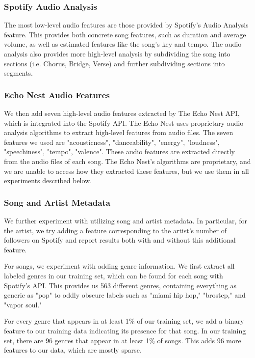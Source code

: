 \documentclass[journal]{IEEEtran}
\begin{document}
\subsubsection{Spotify Audio Analysis}
The most low-level audio features are those provided by Spotify's Audio Analysis feature. This provides both concrete song features, such as duration and average volume, as well as estimated features like the song's key and tempo. The audio analysis also provides more high-level analysis by subdividing the song into sections (i.e. Chorus, Bridge, Verse) and further subdividing sections into segments. \\

\subsubsection{Echo Nest Audio Features}
We then add seven high-level audio features extracted by The Echo Nest API, which is integrated into the Spotify API. The Echo Nest uses proprietary audio analysis algorithms to extract high-level features from audio files. The seven features we used are "acousticness", "danceability", "energy", "loudness", "speechiness", "tempo", "valence". These audio features are extracted directly from the audio files of each song. The Echo Nest's algorithms are proprietary, and we are unable to access how they extracted these features, but we use them in all experiments described below. \\

\subsubsection{Song and Artist Metadata}
We further experiment with utilizing song and artist metadata. In particular, for the artist, we try adding a feature corresponding to the artist's number of followers on Spotify and report results both with and without this additional feature. 

For songs, we experiment with adding genre information. We first extract all labeled genres in our training set, which can be found for each song with Spotify's API. This provides us 563 different genres, containing everything as generic as "pop" to oddly obscure labels such as "miami hip hop," "brostep," and "vapor soul." 

For every genre that appears in at least 1\% of our training set, we add a binary feature to our training data indicating its presence for that song. In our training set, there are 96 genres that appear in at least 1\% of songs. This adds 96 more features to our data, which are mostly sparse.
\end{document}
